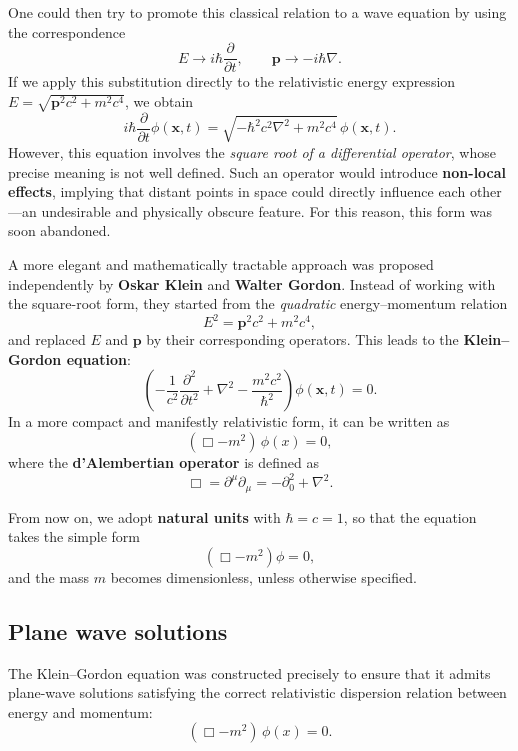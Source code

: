 One could then try to promote this classical relation to a wave equation by using the correspondence
\[
    E \rightarrow i\hbar \frac{\partial}{\partial t},
    \qquad
    \mathbf{p} \rightarrow -i\hbar \nabla.
\]
If we apply this substitution directly to the relativistic energy expression \( E = \sqrt{\mathbf{p}^2 c^2 + m^2 c^4} \), we obtain
\[
    i\hbar \frac{\partial}{\partial t} \phi(\mathbf{x},t)
    = \sqrt{-\hbar^2 c^2 \nabla^2 + m^2 c^4} \, \phi(\mathbf{x},t).
\]
However, this equation involves the \textit{square root of a differential operator}, whose precise meaning is not well defined.
Such an operator would introduce \textbf{non-local effects}, implying that distant points in space could directly influence each other—an undesirable and physically obscure feature.
For this reason, this form was soon abandoned.

A more elegant and mathematically tractable approach was proposed independently by \textbf{Oskar Klein} and \textbf{Walter Gordon}.
Instead of working with the square-root form, they started from the \textit{quadratic} energy–momentum relation
\[
    E^2 = \mathbf{p}^2 c^2 + m^2 c^4,
\]
and replaced \( E \) and \( \mathbf{p} \) by their corresponding operators.
This leads to the \textbf{Klein–Gordon equation}:
\begin{equation}
    \left( -\frac{1}{c^2} \frac{\partial^2}{\partial t^2} + \nabla^2 - \frac{m^2 c^2}{\hbar^2} \right) \phi(\mathbf{x},t) = 0.
\end{equation}
In a more compact and manifestly relativistic form, it can be written as
\begin{equation}
    (\Box - m^2) \, \phi(x) = 0,
    \label{eq:Klein_Gordon_equation}
\end{equation}
where the \textbf{d'Alembertian operator} is defined as
\[
    \Box = \partial^\mu \partial_\mu = -\partial_0^2 + \nabla^2.
\]

From now on, we adopt \textbf{natural units} with \( \hbar = c = 1 \), so that the equation takes the simple form
\[
    (\Box - m^2)\phi = 0,
\]
and the mass \( m \) becomes dimensionless, unless otherwise specified.

\subsection{Plane wave solutions}

The Klein–Gordon equation was constructed precisely to ensure that it admits plane-wave solutions satisfying the correct relativistic dispersion relation between energy and momentum:
\[
    (\Box - m^2)\,\phi(x) = 0.
\]

